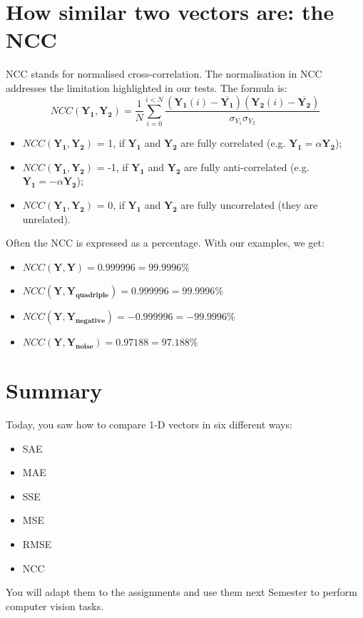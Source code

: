 \documentclass[english,a4paper,12pt,oneside]{article}
\begin{document}
\section{How similar two vectors are: the NCC}

NCC stands for normalised cross-correlation. 
The normalisation in NCC addresses the limitation highlighted in our tests. 
The formula is:
\begin{equation}
NCC(\mathbf{Y_1}, \mathbf{Y_2}) = \frac{1}{N}\sum^{i < N}_{i=0} \frac{(\mathbf{Y_1}(i)-\overline{\mathbf{Y_1}})(\mathbf{Y_2}(i)-\overline{\mathbf{Y_2}})}{\sigma_{Y_1}\sigma_{Y_2}}
\end{equation}
\begin{itemize}
\item $NCC(\mathbf{Y_1}, \mathbf{Y_2})$ = 1, if $\mathbf{Y_1}$ and $\mathbf{Y_2}$ are fully correlated (e.g. $\mathbf{Y_1} = \alpha \mathbf{Y_2}$);
\item $NCC(\mathbf{Y_1}, \mathbf{Y_2})$ = -1, if $\mathbf{Y_1}$ and $\mathbf{Y_2}$ are fully anti-correlated (e.g. $\mathbf{Y_1} = -\alpha \mathbf{Y_2}$);
\item $NCC(\mathbf{Y_1}, \mathbf{Y_2})$ = 0, if $\mathbf{Y_1}$ and $\mathbf{Y_2}$ are fully uncorrelated (they are unrelated).
\end{itemize}
Often the NCC is expressed as a percentage. 
With our examples, we get:
\begin{itemize}
\item $NCC(\mathbf{Y}, \mathbf{Y}) = 0.999996 =	99.9996\%$
\item $NCC(\mathbf{Y}, \mathbf{Y_{quadriple}}) = 0.999996 =	99.9996\%$
\item $NCC(\mathbf{Y}, \mathbf{Y_{negative}}) = -0.999996 =	-99.9996\%$
\item $NCC(\mathbf{Y}, \mathbf{Y_{noise}}) =  0.97188 =	97.188\%$
\end{itemize}


\section{Summary}

Today, you saw how to compare 1-D vectors in six different ways:
\begin{itemize}
\item SAE
\item MAE
\item SSE
\item MSE
\item RMSE
\item NCC
\end{itemize}
You will adapt them to the assignments and use them next Semester to perform computer vision tasks.
\end{document}
